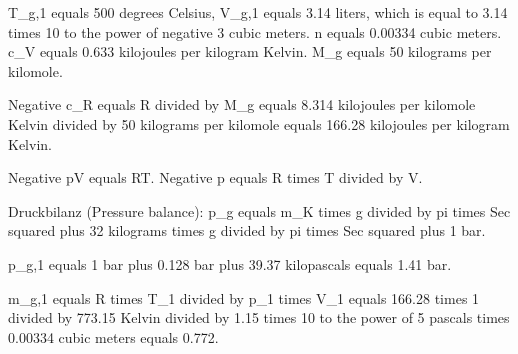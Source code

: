 T_g,1 equals 500 degrees Celsius, V_g,1 equals 3.14 liters, which is equal to 3.14 times 10 to the power of negative 3 cubic meters.  
n equals 0.00334 cubic meters.  
c_V equals 0.633 kilojoules per kilogram Kelvin.  
M_g equals 50 kilograms per kilomole.  

Negative c_R equals R divided by M_g equals 8.314 kilojoules per kilomole Kelvin divided by 50 kilograms per kilomole equals 166.28 kilojoules per kilogram Kelvin.  

Negative pV equals RT.  
Negative p equals R times T divided by V.  

Druckbilanz (Pressure balance):  
p_g equals m_K times g divided by pi times Sec squared plus 32 kilograms times g divided by pi times Sec squared plus 1 bar.  

p_g,1 equals 1 bar plus 0.128 bar plus 39.37 kilopascals equals 1.41 bar.  

m_g,1 equals R times T_1 divided by p_1 times V_1 equals 166.28 times 1 divided by 773.15 Kelvin divided by 1.15 times 10 to the power of 5 pascals times 0.00334 cubic meters equals 0.772.